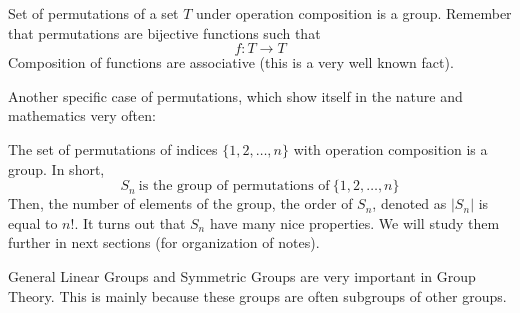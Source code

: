 \begin{example} Set of \alert{permutations} of a set $T$ under operation composition is a group. Remember that permutations are bijective
    functions such that
    \[ f: T \to T\]
    Composition of functions are associative (this is a very well known fact).
\end{example}
Another specific case of permutations, which show itself in the nature and mathematics very often:
\begin{example}
    The set of permutations of  indices $\{ 1,2, \ldots, n\}$ with operation composition is a group. In short,
    \[ S_n \ \text{is the group of permutations of} \ \{1,2, \ldots , n\}\]
    Then, the number of elements of the group, \alert{the order} of $S_n$, denoted as $|S_n|$  is equal to $n!$.
    It turns out that $S_n$ have many nice properties. We will study them further in next sections (for organization of notes).
\end{example}
\begin{remark*}
    General Linear Groups and Symmetric Groups are very important in Group Theory. This is mainly because these groups are often
    \alert{subgroups} of other groups.
\end{remark*}
